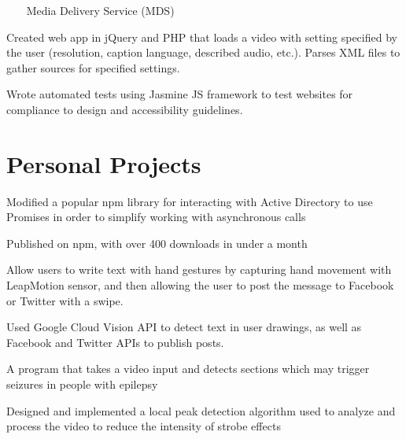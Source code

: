 \documentclass[]{deedy-resume-openfont}
\begin{document}
\begin{minipage}[t]{0.66\textwidth}
~~~ Media Delivery Service (MDS)
\begin{tightemize}
\item Created web app in jQuery and PHP that loads a video with setting specified by the user (resolution, caption language, described audio, etc.). Parses XML files to gather sources for specified settings.
\item Wrote automated tests using Jasmine JS framework to test websites for compliance to design and accessibility guidelines.
\end{tightemize}
\sectionsep


\section{Personal Projects}


\begin{tightemize}
\item Modified a popular npm library for interacting with Active Directory to use Promises in order to simplify working with asynchronous calls 
\item Published on npm, with over 400 downloads in under a month 
\end{tightemize}
\sectionsep


\begin{tightemize}
\item Allow users to write text with hand gestures by capturing hand movement with LeapMotion sensor, and then allowing the user to post the message to Facebook or Twitter with a swipe. 
\item Used Google Cloud Vision API to detect text in user drawings, as well as Facebook and Twitter APIs to publish posts.
\end{tightemize}
\sectionsep

\begin{tightemize}
\item A program that takes a video input and detects sections which may trigger seizures in people with epilepsy
\item Designed and implemented a local peak detection algorithm used to analyze and process the video to reduce the intensity of strobe effects 
\end{tightemize}
\sectionsep


\end{minipage} 
\end{document}

